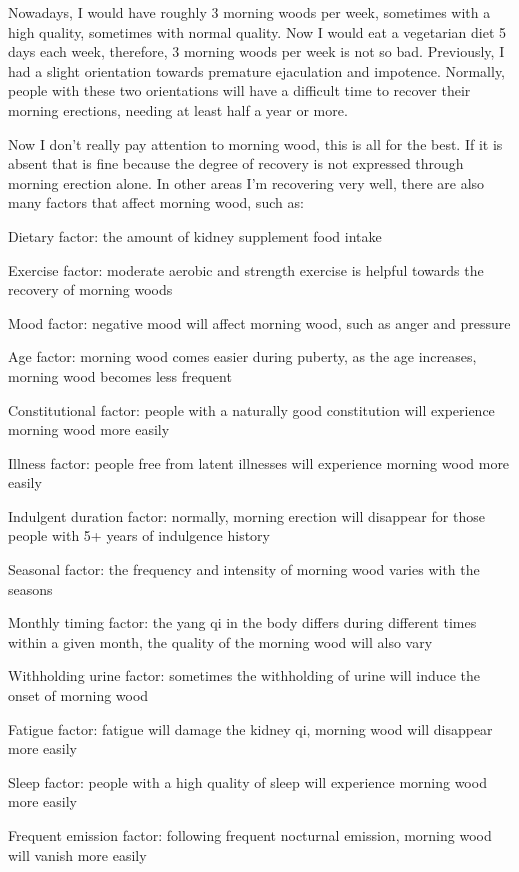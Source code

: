 \documentclass[
]{book}
\begin{document}
Nowadays, I would have roughly 3 morning woods per week, sometimes with a high quality, sometimes with normal quality. Now I would eat a vegetarian diet 5 days each week, therefore, 3 morning woods per week is not so bad. Previously, I had a slight orientation towards premature ejaculation and impotence. Normally, people with these two orientations will have a difficult time to recover their morning erections, needing at least half a year or more.

Now I don't really pay attention to morning wood, this is all for the best. If it is absent that is fine because the degree of recovery is not expressed through morning erection alone. In other areas I'm recovering very well, there are also many factors that affect morning wood, such as:

Dietary factor: the amount of kidney supplement food intake

Exercise factor: moderate aerobic and strength exercise is helpful towards the recovery of morning woods

Mood factor: negative mood will affect morning wood, such as anger and pressure

Age factor: morning wood comes easier during puberty, as the age increases, morning wood becomes less frequent

Constitutional factor: people with a naturally good constitution will experience morning wood more easily

Illness factor: people free from latent illnesses will experience morning wood more easily

Indulgent duration factor: normally, morning erection will disappear for those people with 5+ years of indulgence history

Seasonal factor: the frequency and intensity of morning wood varies with the seasons

Monthly timing factor: the yang qi in the body differs during different times within a given month, the quality of the morning wood will also vary

Withholding urine factor: sometimes the withholding of urine will induce the onset of morning wood

Fatigue factor: fatigue will damage the kidney qi, morning wood will disappear more easily

Sleep factor: people with a high quality of sleep will experience morning wood more easily

Frequent emission factor: following frequent nocturnal emission, morning wood will vanish more easily
\end{document}
